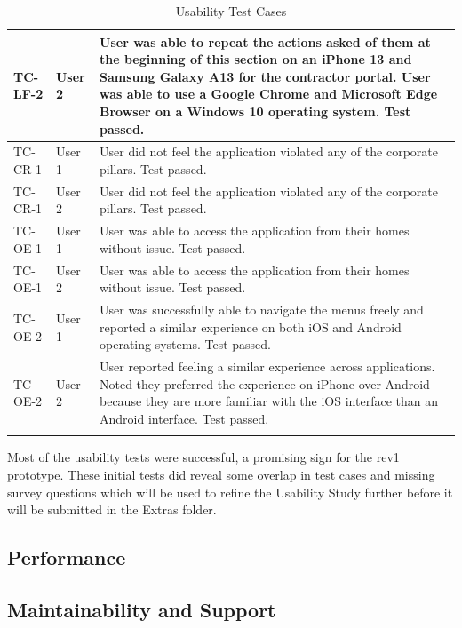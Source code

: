 \documentclass[12pt, titlepage]{article}
\begin{document}
\begin{longtable}{|m{2cm}|m{1.5cm}|m{9cm}|}
  \hline
  TC-LF-2 & User 2& User was able to repeat the actions asked of them
  at the beginning of this section on an iPhone 13 and Samsung Galaxy A13
  for the contractor portal. User was able to use a Google Chrome and
  Microsoft Edge Browser on a Windows 10 operating system. Test passed.\\
  \hline
  TC-CR-1 & User 1& User did not feel the application violated any of
  the corporate pillars. Test passed.\\
  \hline
  TC-CR-1 & User 2& User did not feel the application violated any of
  the corporate pillars. Test passed.\\
  \hline
  TC-OE-1 & User 1 & User was able to access the application from
  their homes without issue. Test passed.\\
  \hline
  TC-OE-1 & User 2& User was able to access the application from
  their homes without issue. Test passed.\\
  \hline
  TC-OE-2 & User 1& User was successfully able to navigate the menus
  freely and reported a similar experience on both iOS
  and Android operating systems. Test passed.\\
  \hline
  TC-OE-2 & User 2& User reported feeling a similar experience across
  applications. Noted they preferred the experience on
  iPhone over Android because they are more familiar with the iOS
  interface than an Android interface. Test passed.\\
  \hline
  \caption{Usability Test Cases}
\end{longtable}
Most of the usability tests were successful, a promising sign for the
rev1 prototype. These initial tests did reveal some overlap in test cases
and missing survey questions which will be used to refine the
Usability Study further before it will be submitted in the Extras folder.

\subsection{Performance}

\subsection{Maintainability and Support}
\end{document}
